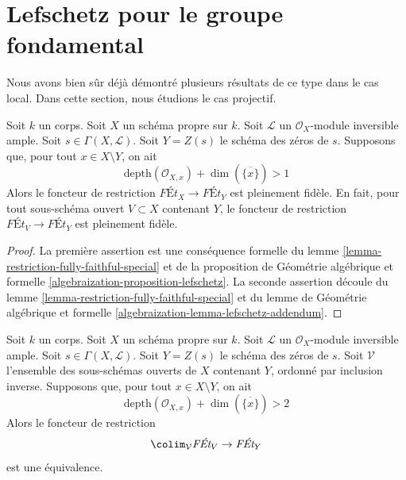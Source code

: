 




\section{Lefschetz pour le groupe fondamental}
\label{section-global-lefschetz}

\noindent
Nous avons bien sûr déjà démontré plusieurs résultats de ce type
dans le cas local. Dans cette section, nous étudions le cas projectif.

\begin{proposition}
\label{proposition-lefschetz-fully-faithful}
Soit $k$ un corps. Soit $X$ un schéma propre sur $k$.
Soit $\mathcal{L}$ un $\mathcal{O}_X$-module inversible ample.
Soit $s \in \Gamma(X, \mathcal{L})$. Soit $Y = Z(s)$ le
schéma des zéros de $s$. Supposons que, pour tout $x \in X \setminus Y$,
on ait
$$
\text{depth}(\mathcal{O}_{X, x}) + \dim(\overline{\{x\}}) > 1
$$
Alors le foncteur de restriction $\textit{F\'Et}_X \to \textit{F\'Et}_Y$
est pleinement fidèle. En fait, pour tout sous-schéma ouvert $V \subset X$
contenant $Y$, le foncteur de restriction
$\textit{F\'Et}_V \to \textit{F\'Et}_Y$
est pleinement fidèle.
\end{proposition}

\begin{proof}
La première assertion est une conséquence formelle du
lemme \ref{lemma-restriction-fully-faithful-special}
et de la
proposition de Géométrie algébrique et formelle
\ref{algebraization-proposition-lefschetz}.
La seconde assertion découle du
lemme \ref{lemma-restriction-fully-faithful-special}
et du
lemme de Géométrie algébrique et formelle
\ref{algebraization-lemma-lefschetz-addendum}.
\end{proof}

\begin{proposition}
\label{proposition-lefschetz-equivalence-general}
Soit $k$ un corps. Soit $X$ un schéma propre sur $k$.
Soit $\mathcal{L}$ un $\mathcal{O}_X$-module inversible ample.
Soit $s \in \Gamma(X, \mathcal{L})$. Soit $Y = Z(s)$ le
schéma des zéros de $s$. Soit $\mathcal{V}$ l'ensemble des
sous-schémas ouverts de $X$ contenant $Y$, ordonné par inclusion inverse.
Supposons que, pour tout $x \in X \setminus Y$, on ait
$$
\text{depth}(\mathcal{O}_{X, x}) + \dim(\overline{\{x\}}) > 2
$$
Alors le foncteur de restriction
$$
\colim_\mathcal{V} \textit{F\'Et}_V \to \textit{F\'Et}_Y
$$
est une équivalence.
\end{proposition}

